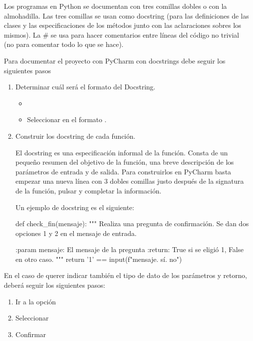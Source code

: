 Los programas en Python se documentan con tres comillas dobles o con la almohadilla. Las tres comillas se usan como docstring (para las definiciones de las clases y las especificaciones de los métodos junto con las aclaraciones sobres los mismos). La \# se usa para hacer comentarios entre líneas del código no trivial (no para comentar todo lo que se hace).


Para documentar el proyecto con PyCharm con docstrings debe seguir los siguientes pasos

\begin{enumerate}

\item Determinar cuál será el formato del Docstring.
	\begin{itemize}
	\item {}
	\item Seleccionar en  el formato .
	\end{itemize}

\item Construir los docstring de cada función. 

El docstring es una especificación informal de la función. Consta de un pequeño resumen del objetivo de la función, una breve descripción de los parámetros de entrada y de salida. Para construirlos en PyCharm basta empezar una nueva línea con 3 dobles comillas     justo después de la signatura de la función, pulsar \keys{\return} y completar la información. 

Un ejemplo de docstring es el siguiente:

\begin{pyverbatim}
def check_fin(mensaje):
    """
    Realiza una pregunta de confirmación. 
    Se dan dos opciones 1 y 2 en el mensaje de entrada.

    :param mensaje: El mensaje de la pregunta
    :return: True si se eligió 1, False en otro caso.
    """
    return '1' == input(f"{mensaje}. sí. no\n")
\end{pyverbatim}

\end{enumerate}

En el caso de querer indicar también el tipo de dato de los parámetros y retorno, deberá seguir los siguientes pasos:


\begin{enumerate}

\item Ir a la opción 

\item Seleccionar 

\item Confirmar 
\end{enumerate}


